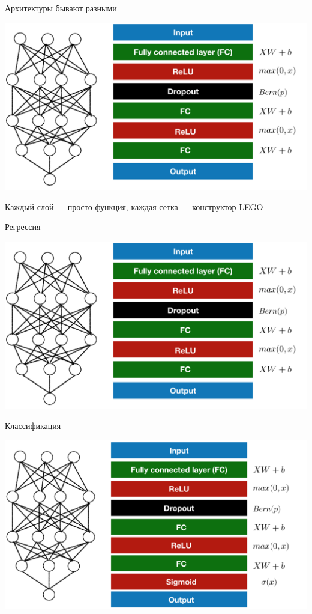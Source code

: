 \documentclass[notes,12pt, aspectratio=169]{beamer}
\begin{document}
\begin{frame}{Архитектуры бывают разными}
\begin{center}
	\includegraphics[width=0.75\paperwidth]{nn_lego_1.png}
\end{center}
Каждый слой — просто функция, каждая сетка — конструктор LEGO
\end{frame}


\begin{frame}{Регрессия}
\begin{center}
	\includegraphics[width=0.75\paperwidth]{nn_lego_1.png}
\end{center}
\end{frame}


\begin{frame}{Классификация}
\begin{center}
	\includegraphics[width=0.75\paperwidth]{lego_class_two.png}
\end{center}
\end{frame}
\end{document}
